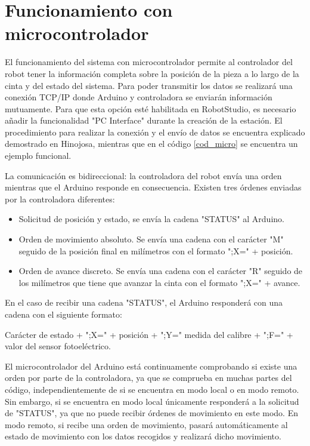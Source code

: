 

\section{Funcionamiento con microcontrolador}

El funcionamiento del sistema con microcontrolador permite al controlador del robot tener la información
completa sobre la posición de la pieza a lo largo de la cinta y del estado del sistema. Para poder 
transmitir los datos se realizará una conexión TCP/IP donde Arduino y controladora se enviarán
información mutuamente. Para que esta opción esté habilitada en RobotStudio, es necesario añadir la 
funcionalidad "PC Interface" durante la creación de la estación. El procedimiento para realizar la conexión 
y el envío de datos se encuentra explicado demostrado en Hinojosa\cite{rea}, mientras que en el código 
\ref{cod_micro} se encuentra un ejemplo funcional.

La comunicación es bidireccional: la controladora del robot envía una orden mientras que el Arduino responde
en consecuencia. Existen tres órdenes enviadas por la controladora diferentes:
\begin{itemize}
    \item Solicitud de posición y estado, se envía la cadena "STATUS" al Arduino.
    \item Orden de movimiento absoluto. Se envía una cadena con el carácter "M" seguido de la posición final en 
    milímetros con el formato ";X=" + posición.
    \item Orden de avance discreto. Se envía una cadena con el carácter "R" seguido de los milímetros que tiene
    que avanzar la cinta con el formato ";X=" + avance.
\end{itemize}

En el caso de recibir una cadena "STATUS", el Arduino responderá con una cadena con el siguiente formato:

Carácter de estado + ";X=" + posición + ";Y=" medida del calibre + ";F=" + valor del sensor fotoeléctrico.

El microcontrolador del Arduino está continuamente comprobando si existe una orden por parte de la controladora,
ya que se comprueba en muchas partes del código, independientemente de si se encuentra en modo local o en modo
remoto. Sin embargo, si se encuentra en modo local únicamente responderá a la solicitud de "STATUS", ya que 
no puede recibir órdenes de movimiento en este modo. En modo remoto, si recibe una orden de movimiento, pasará
automáticamente al estado de movimiento con los datos recogidos y realizará dicho movimiento.

